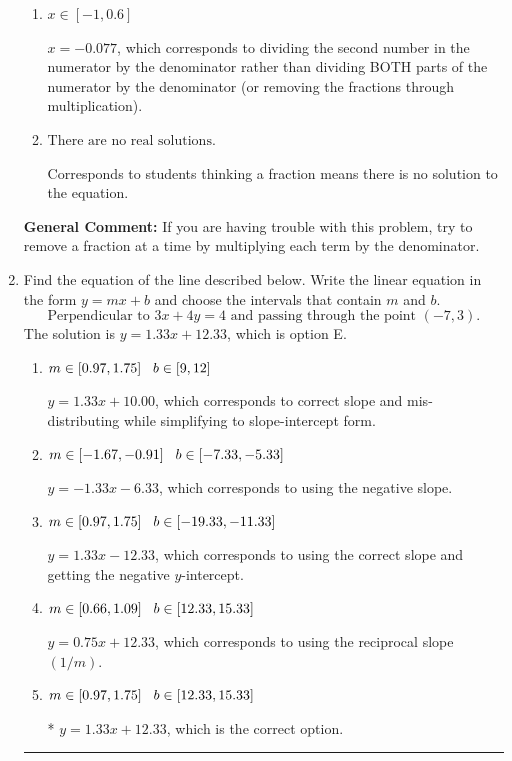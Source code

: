 \documentclass{extbook}[14pt]
\newcommand{\litem}[1]{\item #1

\rule{\textwidth}{0.4pt}}
\begin{document}
\begin{enumerate}
{\begin{enumerate}[label=\Alph*.]
* $x = -1.182$, which is the correct option.
\item \( x \in [-1, 0.6] \)

 $x = -0.077$, which corresponds to dividing the second number in the numerator by the denominator rather than dividing BOTH parts of the numerator by the denominator (or removing the fractions through multiplication).
\item \( \text{There are no real solutions.} \)

Corresponds to students thinking a fraction means there is no solution to the equation.
\end{enumerate}

\textbf{General Comment:} If you are having trouble with this problem, try to remove a fraction at a time by multiplying each term by the denominator.
}
\litem{
Find the equation of the line described below. Write the linear equation in the form $ y=mx+b $ and choose the intervals that contain $m$ and $b$.
\[ \text{Perpendicular to } 3 x + 4 y = 4 \text{ and passing through the point } (-7, 3). \]The solution is \( y = 1.33x + 12.33 \), which is option E.\begin{enumerate}[label=\Alph*.]
\item \( m \in [0.97, 1.75] \hspace*{3mm} b \in [9, 12] \)

 $y = 1.33x + 10.00$, which corresponds to correct slope and mis-distributing while simplifying to slope-intercept form.
\item \( m \in [-1.67, -0.91] \hspace*{3mm} b \in [-7.33, -5.33] \)

 $y = -1.33x - 6.33$, which corresponds to using the negative slope.
\item \( m \in [0.97, 1.75] \hspace*{3mm} b \in [-19.33, -11.33] \)

 $y = 1.33x - 12.33$, which corresponds to using the correct slope and getting the negative $y$-intercept.
\item \( m \in [0.66, 1.09] \hspace*{3mm} b \in [12.33, 15.33] \)

 $y = 0.75x + 12.33$, which corresponds to using the reciprocal slope $(1/m)$.
\item \( m \in [0.97, 1.75] \hspace*{3mm} b \in [12.33, 15.33] \)

* $y = 1.33x + 12.33$, which is the correct option.
\end{enumerate}

}
\end{enumerate}
\end{document}
